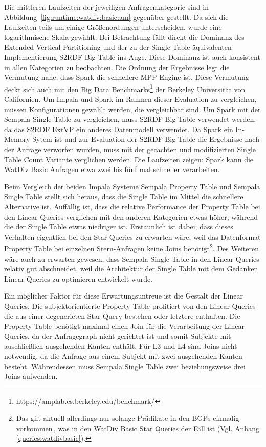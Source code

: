 \documentclass[
  a4paper,
  12pt,
  oneside,
  parskip=half,
  headsepline,
]{scrartcl}
\begin{document}
Die mittleren Laufzeiten der jeweiligen Anfragenkategorie sind in
Abbildung~\ref{fig:runtime:watdiv:basic:am} gegenüber gestellt. Da sich die
Laufzeiten teils um einige Größenordungen unterscheiden, wurde eine
logarithmische Skala gewählt. Bei Betrachtung fällt direkt die Dominanz des
Extended Vertical Partitioning und der zu der Single Table äquivalenten
Implementierung S2RDF Big Table ins Auge. Diese Dominanz ist auch konsistent in
allen Kategorien zu beobachten. Die Ordnung der Ergebnisse legt die Vermutung
nahe, dass Spark die schnellere MPP Engine ist. Diese Vermutung deckt sich auch
mit den Big Data Benchmarks\footnote{https://amplab.cs.berkeley.edu/benchmark/}
der Berkeley Universität von Californien. Um Impala und Spark im Rahmen dieser
Evaluation zu vergleichen, müssen Konfigurationen gewählt werden, die
vergleichbar sind. Um Spark mit der Sempala Single Table zu vergleichen, muss
S2RDF Big Table verwendet werden, da das S2RDF ExtVP ein anderes Datenmodell
verwendet. Da Spark ein In-Memory Sytem ist und zur Evaluation der S2RDF
Big Table die Ergebnisse nach der Anfrage verworfen wurden, muss mit der
gecachten und modifizierten Single Table Count Variante verglichen werden. Die
Laufzeiten zeigen: Spark kann die WatDiv Basic Anfragen etwa zwei bis fünf mal
schneller verarbeiten.

Beim Vergleich der beiden Impala Systeme Sempala Property Table und Sempala
Single Table stellt sich heraus, dass die Single Table im Mittel die schnellere
Alternative ist. Auffällig ist, dass die relative Performance der
Property Table bei den Linear Queries verglichen mit den anderen Kategorien etwas
höher, während die der Single Table etwas niedriger ist. Erstaunlich ist dabei,
dass dieses Verhalten eigentlich bei den Star Queries zu erwarten wäre, weil das
Datenformat Property Table bei einzelnen Stern-Anfragen keine Joins
benötigt\footnote{Das gilt aktuell allerdings nur solange Prädikate in den BGPs
einmalig vorkommen\,\cite{sempala}, was in den WatDiv Basic Star Queries der
Fall ist (Vgl. Anhang \ref{queries:watdivbasic}).}. Des Weiteren wäre auch zu
erwarten gewesen, dass Sempala Single Table in den Linear Queries relativ gut
abschneidet, weil die Architektur der Single Table mit dem Gedanken Linear
Queries zu optimieren entwickelt wurde.

Ein möglicher Faktor für diese Erwartungsuntreue ist die Gestalt der Linear
Queries. Die subjektorientierte Property Table profitiert von den Linear Queries
die aus einer degenerieten Star Query bestehen oder letztere enthalten. Die
Property Table benötigt maximal einen Join für die Verarbeitung der Linear
Queries, da der Anfragegraph nicht gerichtet ist und somit Subjekte mit
auschließlich ausgehenden Kanten enthält. Für L3 und L4 sind Joins nicht
notwendig, da die Anfrage aus einem Subjekt mit zwei ausgehenden Kanten besteht.
Währendessen muss Sempala Single Table zwei beziehungsweise drei Joins
aufwenden.
\end{document}
